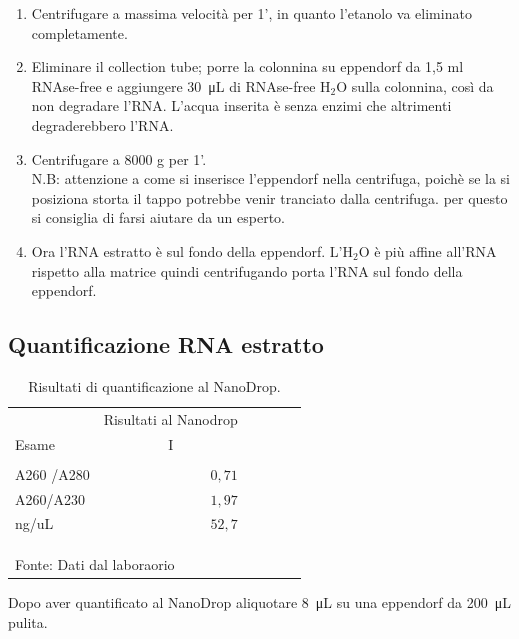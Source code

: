 \begin{enumerate}
\item Centrifugare a massima velocità per 1', in quanto l'etanolo va eliminato completamente.
\item Eliminare il collection tube; porre la colonnina su eppendorf da 1,5 ml RNAse-free e
aggiungere \SI{30}{\micro\liter} di RNAse-free H$_2$O sulla colonnina,
così da non degradare l'RNA.
L'acqua inserita è senza enzimi che altrimenti degraderebbero l'RNA.
\item Centrifugare a 8000 g per 1'.\\
N.B: attenzione a come si inserisce l'eppendorf nella centrifuga, poich\`e se la si posiziona storta
il tappo potrebbe venir tranciato dalla centrifuga. per questo si consiglia di farsi aiutare da un esperto.
\item Ora l'RNA estratto è sul fondo della eppendorf.
L'H$_2$O è pi\`u affine all'RNA rispetto alla matrice
quindi centrifugando porta l'RNA sul fondo della eppendorf.

\end{enumerate}

\subsection{Quantificazione RNA estratto}

\begin{table}[H]
\begin{center}

\caption{Risultati di quantificazione al NanoDrop.}
\vspace{0,3cm}
\begin{tabular}{lrrrrr}
   & \multicolumn{1}{c}{Risultati al Nanodrop} \\
   Esame & \multicolumn{1}{c}{I} \\ \hline
    & & & & & \\

  A260 /A280 & $0,71$  \\
 A260/A230 & $1,97$   \\
  ng/uL & $52,7$   \\ \\ \hline
       & & & & & \\
  & & & & &  \\ \multicolumn{6}{l}{\small Fonte: Dati dal laboraorio}
\end{tabular}

\end{center}
\end{table}
Dopo aver quantificato al NanoDrop aliquotare \SI{8}{\micro\liter} su una eppendorf da \SI{200}{\micro\liter} pulita.

